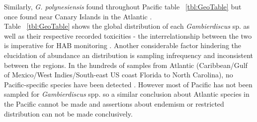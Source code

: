\documentclass[12pt]{article}
\begin{document}
Similarly, \emph{G. polynesiensis} found throughout Pacific table ~\ref{tbl:GeoTable} but once found near Canary Islands in the Atlantic \cite{fraga2011gambierdiscus}. \\
 Table ~\ref{tbl:GeoTable} shows the global distribution of each \emph{Gambierdiscus} sp. as well as their respective recorded toxicities - the interrelationship between the two is imperative for HAB monitoring \cite{testerICHA}.
Another considerable factor hindering the elucidation of abundance an distribution is sampling infrequency and inconsistent between the regions. In the hundreds of samples from Atlantic (Caribbean/Gulf of Mexico/West Indies/South-east US coast Florida to North Carolina), no Pacific-specific species have been detected \cite{berdalet2012global,litaker2010global}. However most of Pacific has not been sampled for \emph{Gambierdiscus} spp. so a similar conclusion about Atlantic species in the Pacific cannot be made and assertions about endemism or restricted distribution can not be made conclusively.

	
\end{document}
